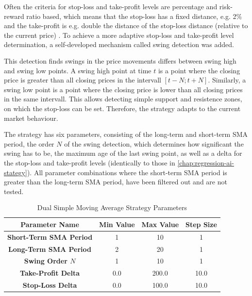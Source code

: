 Often the criteria for stop-loss and take-profit levels are percentage and risk-reward ratio based, which means that the stop-loss has a fixed distance, e.g. 2\% and the take-profit is e.g. double the distance of the stop-loss distance (relative to the current price) \cite{sma-sl-tp}.
To achieve a more adaptive stop-loss and take-profit level determination, a self-developed mechanism called swing detection was added.

This detection finds swings in the price movements differs between swing high and swing low points.
A swing high point at time $t$ is a point where the closing price is greater than all closing prices in the intervall $[t-N; t+N]$.
Similarly, a swing low point is a point where the closing price is lower than all closing prices in the same intervall.
This allows detecting simple support and resistence zones, on which the stop-loss can be set.
Therefore, the strategy adapts to the current market behaviour.



The strategy has six parameters, consisting of the long-term and short-term SMA period, the order $N$ of the swing detection, which determines how significant the swing has to be, the maximum age of the last swing point, as well as a delta for the stop-loss and take-profit levels (identically to those in \autoref{chap:regression-ai-stategy}).
All parameter combinations where the short-term SMA period is greater than the long-term SMA period, have been filtered out and are not tested.

\begin{table}[H]
    \centering
    \begin{tabular}{cccc}
        \toprule
        Parameter Name & Min Value & Max Value & Step Size
        \\
        \midrule
        \textbf{Short-Term SMA Period} & 1   & 10    & 1    \\
        \textbf{Long-Term SMA Period}  & 2   & 20    & 1    \\
        \textbf{Swing Order $N$}       & 1   & 10    & 1    \\
        \textbf{Take-Profit Delta}     & 0.0 & 200.0 & 10.0 \\
        \textbf{Stop-Loss Delta}       & 0.0 & 100.0 & 10.0 \\
        \bottomrule
    \end{tabular}
    \caption{Dual Simple Moving Average Strategy Parameters}
    \label{tbl:sma-strategy-parameters}
\end{table}

